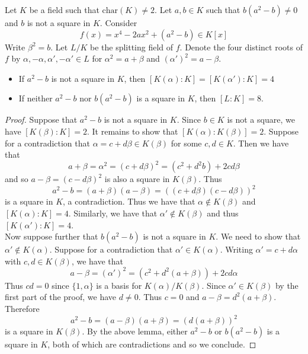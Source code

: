 \documentclass[a4paper]{article}
\begin{document}
\begin{prp}{}{} Let $K$ be a field such that $\text{char}(K)\neq 2$. Let $a,b\in K$ such that $b(a^2-b)\neq 0$ and $b$ is not a square in $K$. Consider $$f(x)=x^4-2ax^2+(a^2-b)\in K[x]$$ Write $\beta^2=b$. Let $L/K$ be the splitting field of $f$. Denote the four distinct roots of $f$ by $\alpha,-\alpha,\alpha',-\alpha'\in L$ for $\alpha^2=a+\beta$ and $(\alpha')^2=a-\beta$. 
\begin{itemize}
\item If $a^2-b$ is not a square in $K$, then $[K(\alpha):K]=[K(\alpha'):K]=4$
\item If neither $a^2-b$ nor $b(a^2-b)$ is a square in $K$, then $[L:K]=8$. 
\end{itemize} 
\begin{proof}
Suppose that $a^2-b$ is not a square in $K$. Since $b\in K$ is not a square, we have $[K(\beta):K]=2$. It remains to show that $[K(\alpha):K(\beta)]=2$. Suppose for a contradiction that $\alpha=c+d\beta\in K(\beta)$ for some $c,d\in K$. Then we have that $$a+\beta=\alpha^2=(c+d\beta)^2=(c^2+d^2b)+2cd\beta$$ and so $a-\beta=(c-d\beta)^2$ is also a square in $K(\beta)$. Thus $$a^2-b=(a+\beta)(a-\beta)=((c+d\beta)(c-d\beta))^2$$ is a square in $K$, a contradiction. Thus we have that $\alpha\notin K(\beta)$ and $[K(\alpha):K]=4$. Similarly, we have that $\alpha'\notin K(\beta)$ and thus $[K(\alpha'):K]=4$. \\

Now suppose further that $b(a^2-b)$ is not a square in $K$. We need to show that $\alpha'\notin K(\alpha)$. Suppose for a contradiction that $\alpha'\in K(\alpha)$. Writing $\alpha'=c+d\alpha$ with $c,d\in K(\beta)$, we have that $$a-\beta=(\alpha')^2=(c^2+d^2(a+\beta))+2cd\alpha$$ Thus $cd=0$ since $\{1,\alpha\}$ is a basis for $K(\alpha)/K(\beta)$. Since $\alpha'\in K(\beta)$ by the first part of the proof, we have $d\neq 0$. Thus $c=0$ and $a-\beta=d^2(a+\beta)$. Therefore $$a^2-b=(a-\beta)(a+\beta)=(d(a+\beta))^2$$ is a square in $K(\beta)$. By the above lemma, either $a^2-b$ or $b(a^2-b)$ is a square in $K$, both of which are contradictions and so we conclude. 
\end{proof}
\end{prp}
\end{document}
